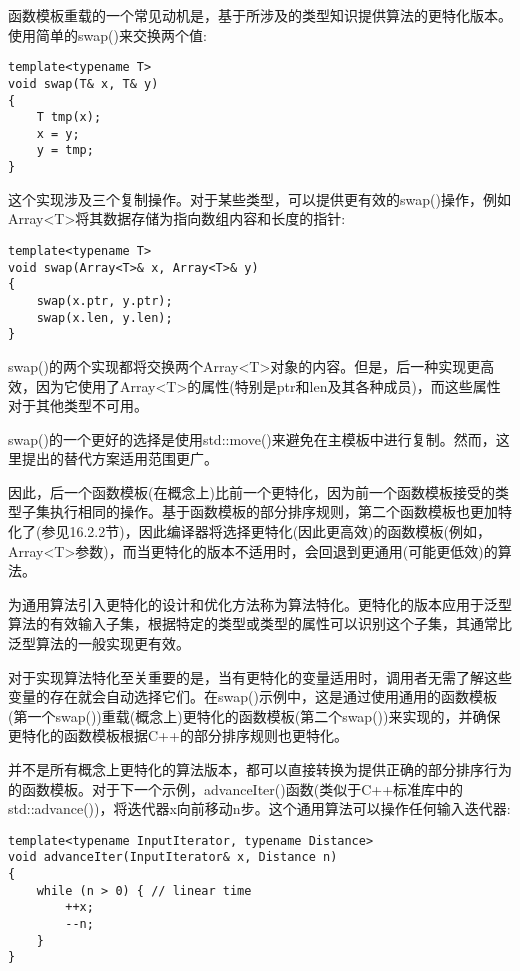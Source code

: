 
函数模板重载的一个常见动机是，基于所涉及的类型知识提供算法的更特化版本。使用简单的swap()来交换两个值:

\begin{lstlisting}[style=styleCXX]
template<typename T>
void swap(T& x, T& y)
{
	T tmp(x);
	x = y;
	y = tmp;
}
\end{lstlisting}

这个实现涉及三个复制操作。对于某些类型，可以提供更有效的swap()操作，例如Array<T>将其数据存储为指向数组内容和长度的指针:

\begin{lstlisting}[style=styleCXX]
template<typename T>
void swap(Array<T>& x, Array<T>& y)
{
	swap(x.ptr, y.ptr);
	swap(x.len, y.len);
}
\end{lstlisting}

swap()的两个实现都将交换两个Array<T>对象的内容。但是，后一种实现更高效，因为它使用了Array<T>的属性(特别是ptr和len及其各种成员)，而这些属性对于其他类型不可用。

\begin{tcolorbox}[colback=webgreen!5!white,colframe=webgreen!75!black]
\hspace*{0.75cm}swap()的一个更好的选择是使用std::move()来避免在主模板中进行复制。然而，这里提出的替代方案适用范围更广。
\end{tcolorbox}

因此，后一个函数模板(在概念上)比前一个更特化，因为前一个函数模板接受的类型子集执行相同的操作。基于函数模板的部分排序规则，第二个函数模板也更加特化了(参见16.2.2节)，因此编译器将选择更特化(因此更高效)的函数模板(例如，Array<T>参数)，而当更特化的版本不适用时，会回退到更通用(可能更低效)的算法。

为通用算法引入更特化的设计和优化方法称为算法特化。更特化的版本应用于泛型算法的有效输入子集，根据特定的类型或类型的属性可以识别这个子集，其通常比泛型算法的一般实现更有效。

对于实现算法特化至关重要的是，当有更特化的变量适用时，调用者无需了解这些变量的存在就会自动选择它们。在swap()示例中，这是通过使用通用的函数模板(第一个swap())重载(概念上)更特化的函数模板(第二个swap())来实现的，并确保更特化的函数模板根据C++的部分排序规则也更特化。

并不是所有概念上更特化的算法版本，都可以直接转换为提供正确的部分排序行为的函数模板。对于下一个示例，advanceIter()函数(类似于C++标准库中的std::advance())，将迭代器x向前移动n步。这个通用算法可以操作任何输入迭代器:

\begin{lstlisting}[style=styleCXX]
template<typename InputIterator, typename Distance>
void advanceIter(InputIterator& x, Distance n)
{
	while (n > 0) { // linear time
		++x;
		--n;
	}
}
\end{lstlisting}

